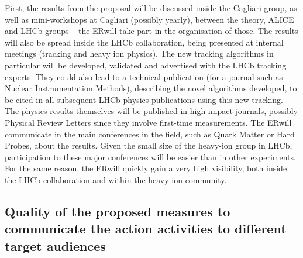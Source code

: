 \documentclass[a4paper,11pt]{article}
\newcommand{\ER}{ER}
\begin{document}
First, the results from the proposal will be discussed inside the Cagliari group, as well as mini-workshops at Cagliari (possibly yearly), between the theory, ALICE and LHCb groups -- the \ER will take part in the organisation of those. The results will also be spread inside the LHCb collaboration, being presented at internal meetings (tracking and heavy ion physics). The new tracking algorithms in particular will be developed, validated and advertised with the LHCb tracking experts. They could also lead to a technical publication (for a journal such as Nuclear Instrumentation Methods), describing the novel algorithms developed, to be cited in all subsequent LHCb physics publications using this new tracking. The physics results themselves will be published in high-impact journals, possibly Physical Review Letters since they involve first-time measurements. The \ER will communicate in the main conferences in the field, such as Quark Matter or Hard Probes, about the results. Given the small size of the heavy-ion group in LHCb, participation to these major conferences will be easier than in other experiments. For the same reason, the \ER will quickly gain a very high visibility, both inside the LHCb collaboration and within the heavy-ion community.



%           

\subsection{Quality of the proposed measures to communicate the action activities to different target audiences }
% 
% 
\end{document}
